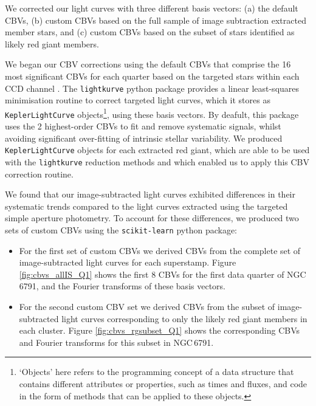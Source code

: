 We corrected our light curves with three different basis vectors: (a) the default \Kepler{} CBVs, (b) custom CBVs based on the full sample of image subtraction extracted member stars, and (c) custom CBVs based on the subset of stars identified as likely red giant members.

We began our CBV corrections using the default \Kepler{} CBVs that comprise the 16 most significant CBVs for each quarter based on the targeted stars within each CCD channel \citep{thompson_kepler_2016}. The \texttt{lightkurve} python package provides a linear least-squares minimisation routine to correct targeted light curves, which it stores as \texttt{KeplerLightCurve} objects\footnote[2]{`Objects' here refers to the programming concept of a data structure that contains different attributes or properties, such as times and fluxes, and code in the form of methods that can be applied to these objects.}, using these basis vectors. By deafult, this package uses the 2 highest-order CBVs to fit and remove systematic signals, whilst avoiding significant over-fitting of intrinsic stellar variability. We produced \texttt{KeplerLightCurve} objects for each extracted red giant, which are able to be used with the \texttt{lightkurve} reduction methods and which enabled us to apply this CBV correction routine.

We found that our image-subtracted light curves exhibited differences in their systematic trends compared to the light curves extracted using the targeted simple aperture photometry. To account for these differences, we produced two sets of custom CBVs using the \texttt{scikit-learn} python package:
\begin{itemize}
    \item For the first set of custom CBVs we derived CBVs from the complete set of image-subtracted light curves for each superstamp. Figure \ref{fig:cbvs_allIS_Q1} shows the first 8 CBVs for the first data quarter of NGC\,6791, and the Fourier transforms of these basis vectors.
    
    \item For the second custom CBV set we derived CBVs from the subset of image-subtracted light curves corresponding to only the likely red giant members in each cluster. Figure \ref{fig:cbvs_rgsubset_Q1} shows the corresponding CBVs and Fourier transforms for this subset in NGC\,6791.
\end{itemize}

